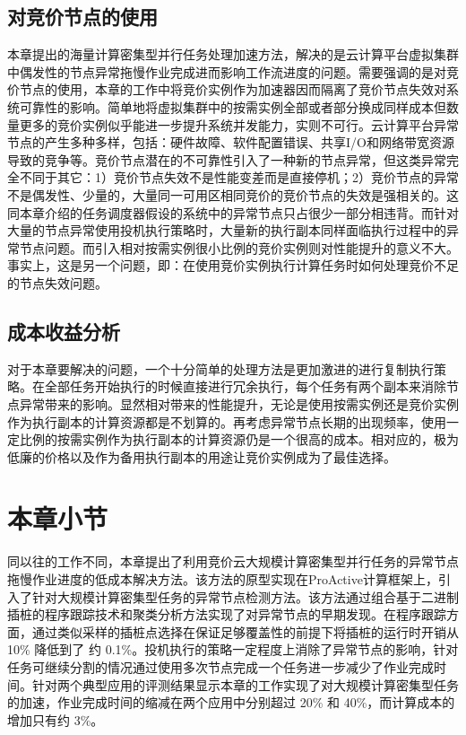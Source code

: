 \subsection{对竞价节点的使用}
本章提出的海量计算密集型并行任务处理加速方法，解决的是云计算平台虚拟集群中偶发性的节点异常拖慢作业完成进而影响工作流进度的问题。需要强调的是对竞价节点的使用，本章的工作中将竞价实例作为加速器因而隔离了竞价节点失效对系统可靠性的影响。简单地将虚拟集群中的按需实例全部或者部分换成同样成本但数量更多的竞价实例似乎能进一步提升系统并发能力，实则不可行。云计算平台异常节点的产生多种多样，包括：硬件故障、软件配置错误、共享I/O和网络带宽资源导致的竞争等。竞价节点潜在的不可靠性引入了一种新的节点异常，但这类异常完全不同于其它：1）竞价节点失效不是性能变差而是直接停机；2）竞价节点的异常不是偶发性、少量的，大量同一可用区相同竞价的竞价节点的失效是强相关的。这同本章介绍的任务调度器假设的系统中的异常节点只占很少一部分相违背。而针对大量的节点异常使用投机执行策略时，大量新的执行副本同样面临执行过程中的异常节点问题。而引入相对按需实例很小比例的竞价实例则对性能提升的意义不大。事实上，这是另一个问题，即：在使用竞价实例执行计算任务时如何处理竞价不足的节点失效问题。

\subsection{成本收益分析}
对于本章要解决的问题，一个十分简单的处理方法是更加激进的进行复制执行策略。在全部任务开始执行的时候直接进行冗余执行，每个任务有两个副本来消除节点异常带来的影响。显然相对带来的性能提升，无论是使用按需实例还是竞价实例作为执行副本的计算资源都是不划算的。再考虑异常节点长期的出现频率，使用一定比例的按需实例作为执行副本的计算资源仍是一个很高的成本。相对应的，极为低廉的价格以及作为备用执行副本的用途让竞价实例成为了最佳选择。

\section{本章小节}
同以往的工作不同，本章提出了利用竞价云大规模计算密集型并行任务的异常节点拖慢作业进度的低成本解决方法。该方法的原型实现在ProActive计算框架上，引入了针对大规模计算密集型任务的异常节点检测方法。该方法通过组合基于二进制插桩的程序跟踪技术和聚类分析方法实现了对异常节点的早期发现。在程序跟踪方面，通过类似采样的插桩点选择在保证足够覆盖性的前提下将插桩的运行时开销从 10\% 降低到了 约 0.1\%。投机执行的策略一定程度上消除了异常节点的影响，针对任务可继续分割的情况通过使用多次节点完成一个任务进一步减少了作业完成时间。针对两个典型应用的评测结果显示本章的工作实现了对大规模计算密集型任务的加速，作业完成时间的缩减在两个应用中分别超过 20\% 和 40\%，而计算成本的增加只有约 3\%。
